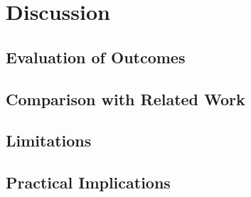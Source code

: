 \chapter{Discussion}\label{ch:discussion}

\section{Evaluation of Outcomes}

\section{Comparison with Related Work}

\section{Limitations}

\section{Practical Implications}
